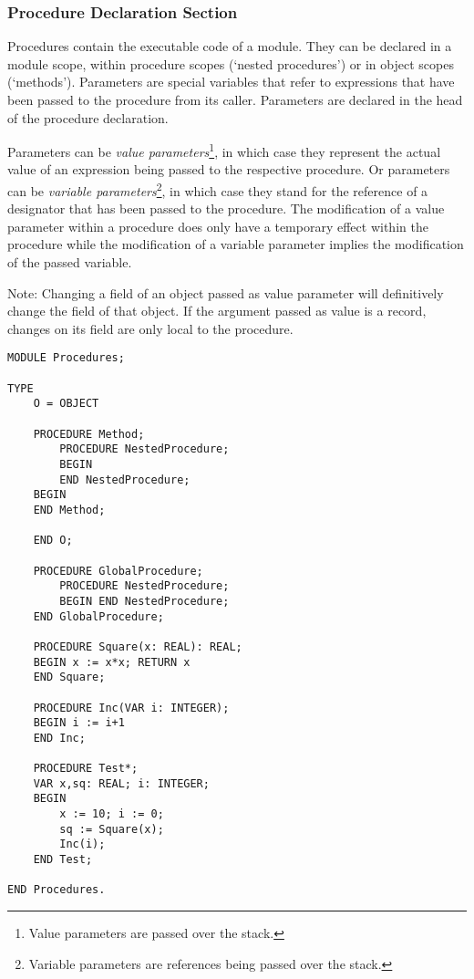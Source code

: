 \documentclass[a4paper,11pt]{article}
\begin{document}
\subsubsection{Procedure Declaration Section}\label{section:ProcedureDeclarationSection}
Procedures contain the executable code of a module. They can be declared in a module scope, within procedure scopes (`nested procedures') or in object scopes (`methods'). Parameters are special variables that refer to expressions that have been passed to the procedure from its caller. Parameters are declared in the head of the procedure declaration.

Parameters can be {\em value parameters}\footnote{Value parameters are passed over the stack.}, in which case they represent the actual value of an expression being passed to the respective procedure. Or parameters can be {\em variable parameters}\footnote{Variable parameters are references being passed over the stack.}, in which case they stand for the reference of a designator that has been passed to the procedure. The modification of a value parameter within a procedure does only have a temporary effect within the procedure while the modification of a variable parameter implies the modification of the passed variable.

Note: Changing a field of an object passed as value parameter will definitively change the field of that object. If the argument passed as value is a record, changes on its field are only local to the procedure.

\begin{lstlisting}[language=Oberon,frame=none,caption={Procedures}]
MODULE Procedures;

TYPE
    O = OBJECT

    PROCEDURE Method;
        PROCEDURE NestedProcedure;
        BEGIN
        END NestedProcedure;
    BEGIN
    END Method;

    END O;

    PROCEDURE GlobalProcedure;
        PROCEDURE NestedProcedure;
        BEGIN END NestedProcedure;
    END GlobalProcedure;

    PROCEDURE Square(x: REAL): REAL;
    BEGIN x := x*x; RETURN x
    END Square;

    PROCEDURE Inc(VAR i: INTEGER);
    BEGIN i := i+1
    END Inc;

    PROCEDURE Test*;
    VAR x,sq: REAL; i: INTEGER;
    BEGIN
        x := 10; i := 0;
        sq := Square(x);
        Inc(i);
    END Test;

END Procedures.
\end{lstlisting}
\end{document}
